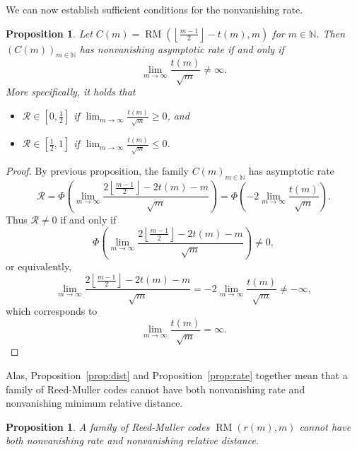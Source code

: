 \documentclass{amsart}
\newtheorem{proposition}[theorem]{Proposition}
\theoremstyle{definition}
\newcommand{\N}{{\mathbb{N}}}
\newcommand{\floor}[1]{\left\lfloor#1\right\rfloor}
\DeclareMathOperator{\RM}{RM}
\begin{document}
We can now establish sufficient conditions for the nonvanishing rate. 
\begin{proposition}
Let $C(m)=\RM(\floor{\frac{m-1}{2}} - t(m), m)$ for $m\in \N$. Then $(C(m))_{m\in \N}$ has nonvanishing asymptotic rate if and only if\[\lim_{m\to \infty} \frac{t(m)}{\sqrt{m}}\neq \infty.\]
\label{prop:vanish}
More specifically, it holds that 
\begin{itemize}
\item $\mathcal{R}\in [0,\frac{1}{2}]$ if $\lim_{m\to \infty} \frac{t(m)}{\sqrt{m}}\geq 0$, and 
\item $\mathcal{R}\in [\frac{1}{2},1]$ if  $\lim_{m\to \infty} \frac{t(m)}{\sqrt{m}}\leq 0$.
\end{itemize}
\end{proposition}
\begin{proof}
By previous proposition, the family ${C(m)}_{m\in \N}$ has asymptotic rate \[\mathcal{R}=\Phi\left(\lim_{m\to\infty} \frac{2 \floor{\frac{m-1}{2}}- 2t(m) -m}{\sqrt{m}} \right)=\Phi\left(- 2 \lim_{m\to\infty} \frac{ t(m)}{\sqrt{m}} \right).  \] Thus $\mathcal{R}\neq 0$ if and only if \[\Phi\left(\lim_{m\to\infty} \frac{2 \floor{\frac{m-1}{2}}- 2t(m) -m}{\sqrt{m}} \right) \neq 0,\] or equivalently, \[\lim_{m\to\infty} \frac{2 \floor{\frac{m-1}{2}}- 2t(m) -m}{\sqrt{m}} = - 2 \lim_{m\to\infty} \frac{ t(m)}{\sqrt{m}} \neq -\infty,\]  which corresponds to 
\[\lim_{m\to \infty} \frac{t(m)}{\sqrt{m}}= \infty.\]

\end{proof}

Alas, Proposition~\ref{prop:dist} and Proposition~\ref{prop:rate} together mean that a family of Reed-Muller codes cannot have both nonvanishing rate and nonvanishing minimum relative distance.
\begin{proposition}
A family of Reed-Muller codes $\RM(r(m), m)$ cannot have both nonvanishing rate
and nonvanishing relative distance.

\end{proposition}
\end{document}
